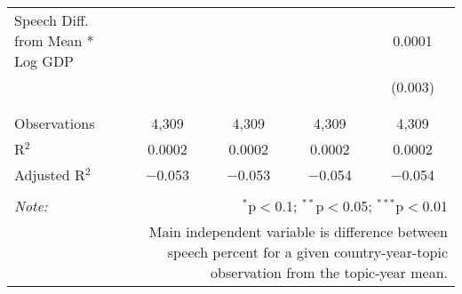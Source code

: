 \begin{table}[!htbp]
\begin{tabular}{@{\extracolsep{5pt}}lcccc}
 Speech Diff. from Mean * Log GDP &  &  &  & 0.0001 \\ 
  &  &  &  & (0.003) \\ 
  & & & & \\ 
\hline \\[-1.8ex] 
Observations & 4,309 & 4,309 & 4,309 & 4,309 \\ 
R$^{2}$ & 0.0002 & 0.0002 & 0.0002 & 0.0002 \\ 
Adjusted R$^{2}$ & $-$0.053 & $-$0.053 & $-$0.054 & $-$0.054 \\ 
\hline 
\hline \\[-1.8ex] 
\textit{Note:}  & \multicolumn{4}{r}{$^{*}$p$<$0.1; $^{**}$p$<$0.05; $^{***}$p$<$0.01} \\ 
 & \multicolumn{4}{r}{Main independent variable is difference between speech percent for a given country-year-topic observation from the topic-year mean.} \\ 
\end{tabular} 
\end{table} 

